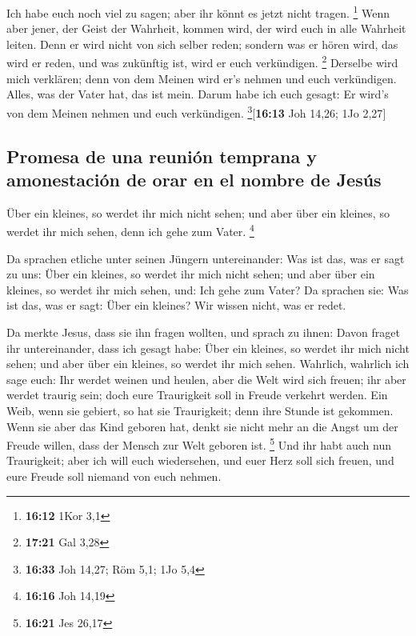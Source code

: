  Ich habe euch noch viel zu sagen; aber ihr könnt es
jetzt nicht tragen. \footnote{\textbf{16:12} 1Kor 3,1} 
Wenn aber jener, der Geist der Wahrheit, kommen wird, der wird euch in
alle Wahrheit leiten. Denn er wird nicht von sich selber reden; sondern
was er hören wird, das wird er reden, und was zukünftig ist, wird er
euch verkündigen. \footnote{\textbf{17:21} Gal 3,28} 
Derselbe wird mich verklären; denn von dem Meinen wird er's nehmen und
euch verkündigen.  Alles, was der Vater hat, das ist
mein. Darum habe ich euch gesagt: Er wird's von dem Meinen nehmen und
euch verkündigen. \footnote{\textbf{16:33} Joh 14,27; Röm 5,1; 1Jo 5,4}{[}\textbf{16:13}
Joh 14,26; 1Jo 2,27{]}

\hypertarget{promesa-de-una-reuniuxf3n-temprana-y-amonestaciuxf3n-de-orar-en-el-nombre-de-jesuxfas}{%
\subsection{Promesa de una reunión temprana y amonestación de orar en el
nombre de
Jesús}\label{promesa-de-una-reuniuxf3n-temprana-y-amonestaciuxf3n-de-orar-en-el-nombre-de-jesuxfas}}

 Über ein kleines, so werdet ihr mich nicht sehen; und
aber über ein kleines, so werdet ihr mich sehen, denn ich gehe zum
Vater. \footnote{\textbf{16:16} Joh 14,19}

 Da sprachen etliche unter seinen Jüngern untereinander:
Was ist das, was er sagt zu uns: Über ein kleines, so werdet ihr mich
nicht sehen; und aber über ein kleines, so werdet ihr mich sehen, und:
Ich gehe zum Vater?  Da sprachen sie: Was ist das, was er
sagt: Über ein kleines? Wir wissen nicht, was er redet.

 Da merkte Jesus, dass sie ihn fragen wollten, und sprach
zu ihnen: Davon fraget ihr untereinander, dass ich gesagt habe: Über ein
kleines, so werdet ihr mich nicht sehen; und aber über ein kleines, so
werdet ihr mich sehen.  Wahrlich, wahrlich ich sage euch:
Ihr werdet weinen und heulen, aber die Welt wird sich freuen; ihr aber
werdet traurig sein; doch eure Traurigkeit soll in Freude verkehrt
werden.  Ein Weib, wenn sie gebiert, so hat sie
Traurigkeit; denn ihre Stunde ist gekommen. Wenn sie aber das Kind
geboren hat, denkt sie nicht mehr an die Angst um der Freude willen,
dass der Mensch zur Welt geboren ist. \footnote{\textbf{16:21} Jes 26,17}
 Und ihr habt auch nun Traurigkeit; aber ich will euch
wiedersehen, und euer Herz soll sich freuen, und eure Freude soll
niemand von euch nehmen.

